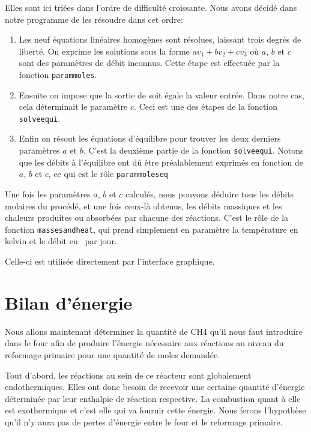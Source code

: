 \documentclass[a4paper,12pt]{article}
\begin{document}
Elles sont ici triées dans l'ordre de difficulté croissante.
Nous avons décidé dans notre programme de les résoudre dans cet ordre:
\begin{enumerate}
    \item Les neuf équations linéaires homogènes sont résolues,
        laissant trois degrés de liberté.
        On exprime les solutions sous la forme $av_1 + bv_2 + cv_3$
        où $a$, $b$ et $c$ sont des paramètres de débit inconnus.
        Cette étape est effectuée par la fonction \texttt{param\textunderscore moles}.
    \item Ensuite on impose que la sortie de  soit égale la valeur entrée.
        Dans notre cas, cela déterminait le paramètre $c$.
        Ceci est une des étapes de la fonction \texttt{solve\textunderscore equi}.
    \item Enfin on résout les équations d'équilibre pour trouver les deux derniers
        paramètres $a$ et $b$. C'est la deuxième partie de la fonction \texttt{solve\textunderscore equi}.
        Notons que les débits à l'équilibre ont dû être préalablement exprimés en fonction
        de $a$, $b$ et $c$, ce qui est le rôle \texttt{param\textunderscore moles\textunderscore eq}
\end{enumerate}

Une fois les paramètres $a$, $b$ et $c$ calculés, nous pouvons déduire tous les débits
molaires du procédé, et une fois ceux-là obtenus,
les débits massiques et les chaleurs produites ou absorbées par chacune des réactions.
C'est le rôle de la fonction \texttt{masses\textunderscore and\textunderscore heat},
qui prend simplement en paramètre la température en kelvin et le débit en \kilogram\ par jour.

Celle-ci est utilisée directement par l'interface graphique.

\section{Bilan d'énergie}

Nous allons maintenant déterminer la quantité de CH4 qu’il nous faut introduire
dans le four afin de produire l’énergie nécessaire aux réactions
au niveau du reformage primaire pour une quantité de moles demandée.  

Tout d’abord, les réactions au sein de ce réacteur sont globalement endothermiques.
Elles ont donc besoin de recevoir une certaine quantité d’énergie
déterminée par leur enthalpie de réaction respective.
La combustion quant à elle est exothermique et c’est elle qui va fournir cette énergie.
Nous ferons l’hypothèse qu’il n’y aura pas de pertes d’énergie
entre le four et le reformage primaire.
\end{document}
